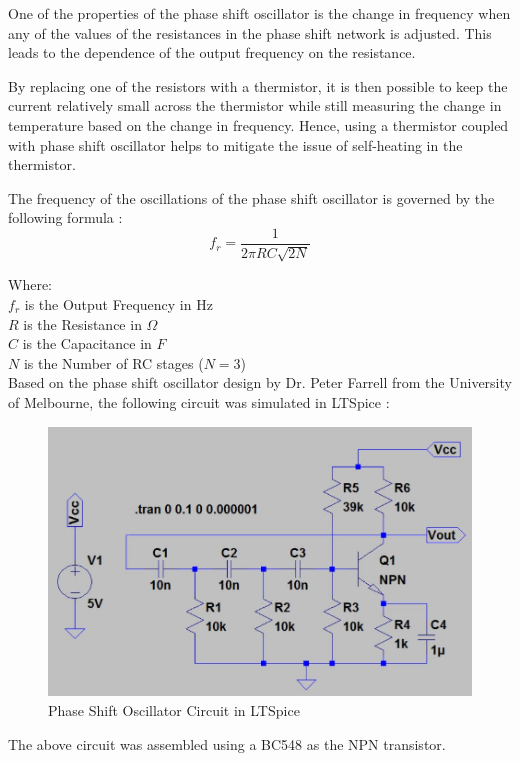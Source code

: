 One of the properties of the phase shift oscillator is the change in frequency when any of the values of the resistances in the phase shift network is adjusted. This leads to the dependence of the output frequency on the resistance.  

By replacing one of the resistors with a thermistor, it is then possible to keep the current relatively small across the thermistor while still measuring the change in temperature based on the change in frequency. Hence, using a thermistor coupled with phase shift oscillator helps to mitigate the issue of self-heating in the thermistor.  

The frequency of the oscillations of the phase shift oscillator is governed by the following formula \cite{psotutorial}:
\begin{equation}
	f_r = \frac{1}{2 \pi RC \sqrt{2N}}
	\label{frequencyoutput}
\end{equation} 

Where:  \\
$f_r$ is the Output Frequency in Hz \\
$R$ is the Resistance in $\Omega$ \\
$C$ is the Capacitance in $F$ \\
$N$ is the Number of RC stages ($N=3$) \\

Based on the phase shift oscillator design by Dr. Peter Farrell from the University of Melbourne, the following circuit was simulated in LTSpice \cite{peterfarrell}: 

\begin{figure}[H]
	\centering
	\includegraphics[width=0.8\linewidth]{psoltspice.jpg}
	\caption{Phase Shift Oscillator Circuit in LTSpice \cite{peterfarrell}}
	\label{psoltspice}
\end{figure}

The above circuit was assembled using a BC548 as the NPN transistor. \cite{bc548}

